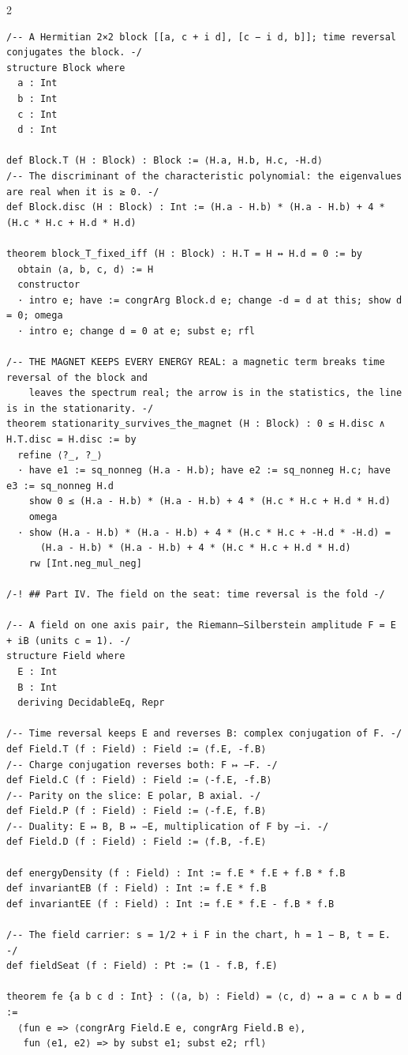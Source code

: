 \documentclass[10pt]{article}
\begin{document}
\begin{multicols}{2}
\begin{Verbatim}[fontsize=\fontsize{6.0}{6.9}\selectfont,breaklines,breakanywhere,breaksymbolleft={}]
/-- A Hermitian 2×2 block [[a, c + i d], [c − i d, b]]; time reversal conjugates the block. -/
structure Block where
  a : Int
  b : Int
  c : Int
  d : Int

def Block.T (H : Block) : Block := ⟨H.a, H.b, H.c, -H.d⟩
/-- The discriminant of the characteristic polynomial: the eigenvalues are real when it is ≥ 0. -/
def Block.disc (H : Block) : Int := (H.a - H.b) * (H.a - H.b) + 4 * (H.c * H.c + H.d * H.d)

theorem block_T_fixed_iff (H : Block) : H.T = H ↔ H.d = 0 := by
  obtain ⟨a, b, c, d⟩ := H
  constructor
  · intro e; have := congrArg Block.d e; change -d = d at this; show d = 0; omega
  · intro e; change d = 0 at e; subst e; rfl

/-- THE MAGNET KEEPS EVERY ENERGY REAL: a magnetic term breaks time reversal of the block and
    leaves the spectrum real; the arrow is in the statistics, the line is in the stationarity. -/
theorem stationarity_survives_the_magnet (H : Block) : 0 ≤ H.disc ∧ H.T.disc = H.disc := by
  refine ⟨?_, ?_⟩
  · have e1 := sq_nonneg (H.a - H.b); have e2 := sq_nonneg H.c; have e3 := sq_nonneg H.d
    show 0 ≤ (H.a - H.b) * (H.a - H.b) + 4 * (H.c * H.c + H.d * H.d)
    omega
  · show (H.a - H.b) * (H.a - H.b) + 4 * (H.c * H.c + -H.d * -H.d) =
      (H.a - H.b) * (H.a - H.b) + 4 * (H.c * H.c + H.d * H.d)
    rw [Int.neg_mul_neg]

/-! ## Part IV. The field on the seat: time reversal is the fold -/

/-- A field on one axis pair, the Riemann–Silberstein amplitude F = E + iB (units c = 1). -/
structure Field where
  E : Int
  B : Int
  deriving DecidableEq, Repr

/-- Time reversal keeps E and reverses B: complex conjugation of F. -/
def Field.T (f : Field) : Field := ⟨f.E, -f.B⟩
/-- Charge conjugation reverses both: F ↦ −F. -/
def Field.C (f : Field) : Field := ⟨-f.E, -f.B⟩
/-- Parity on the slice: E polar, B axial. -/
def Field.P (f : Field) : Field := ⟨-f.E, f.B⟩
/-- Duality: E ↦ B, B ↦ −E, multiplication of F by −i. -/
def Field.D (f : Field) : Field := ⟨f.B, -f.E⟩

def energyDensity (f : Field) : Int := f.E * f.E + f.B * f.B
def invariantEB (f : Field) : Int := f.E * f.B
def invariantEE (f : Field) : Int := f.E * f.E - f.B * f.B

/-- The field carrier: s = 1/2 + i F in the chart, h = 1 − B, t = E. -/
def fieldSeat (f : Field) : Pt := (1 - f.B, f.E)

theorem fe {a b c d : Int} : (⟨a, b⟩ : Field) = ⟨c, d⟩ ↔ a = c ∧ b = d :=
  ⟨fun e => ⟨congrArg Field.E e, congrArg Field.B e⟩,
   fun ⟨e1, e2⟩ => by subst e1; subst e2; rfl⟩


\end{Verbatim}
\end{multicols}
\end{document}
